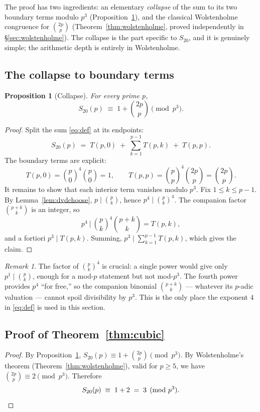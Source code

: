 \documentclass[11pt,a4paper]{article}
\newtheorem{proposition}[theorem]{Proposition}
\theoremstyle{definition}
\theoremstyle{remark}
\newtheorem{remark}[theorem]{Remark}
\newcommand{\Sx}{S_{20}}
\begin{document}
The proof has two ingredients: an elementary \emph{collapse} of the sum to its
two boundary terms modulo $p^{3}$ (Proposition~\ref{prop:collapse}), and the
classical Wolstenholme congruence for $\binom{2p}{p}$
(Theorem~\ref{thm:wolstenholme}, proved independently in \S\ref{sec:wolstenholme}).
The collapse is the part specific to $\Sx$, and it is genuinely simple; the
arithmetic depth is entirely in Wolstenholme.

\subsection{The collapse to boundary terms}

\begin{proposition}[Collapse]\label{prop:collapse}
For every prime $p$,
\[
  \Sx(p)\;\equiv\; 1 + \binom{2p}{p}\pmod{p^{3}}.
\]
\end{proposition}

\begin{proof}
Split the sum \eqref{eq:def} at its endpoints:
\[
  \Sx(p) \;=\; T(p,0) \;+\; \sum_{k=1}^{p-1} T(p,k) \;+\; T(p,p).
\]
The boundary terms are explicit:
\[
  T(p,0)=\binom{p}{0}^{4}\binom{p}{0}=1,
  \qquad
  T(p,p)=\binom{p}{p}^{4}\binom{2p}{p}=\binom{2p}{p}.
\]
It remains to show that each interior term vanishes modulo $p^{3}$.  Fix
$1\le k\le p-1$.  By Lemma~\ref{lem:dvdchoose}, $p\mid\binom{p}{k}$, hence
$p^{4}\mid\binom{p}{k}^{4}$.  The companion factor $\binom{p+k}{k}$ is an
integer, so
\[
  p^{4}\ \Big|\ \binom{p}{k}^{4}\binom{p+k}{k} = T(p,k),
\]
and a fortiori $p^{3}\mid T(p,k)$.  Summing, $p^3 \mid \sum_{k=1}^{p-1}T(p,k)$,
which gives the claim.
\end{proof}

\begin{remark}
The factor of $\binom{p}{k}^{4}$ is crucial: a single power would give only
$p^{1}\mid\binom{p}{k}$, enough for a mod-$p$ statement but not mod-$p^{3}$.  The
fourth power provides $p^{4}$ ``for free,'' so the companion binomial
$\binom{p+k}{k}$ --- whatever its $p$-adic valuation --- cannot spoil
divisibility by $p^{3}$.  This is the only place the exponent $4$ in
\eqref{eq:def} is used in this section.
\end{remark}

\subsection{Proof of Theorem~\ref{thm:cubic}}

\begin{proof}
By Proposition~\ref{prop:collapse}, $\Sx(p)\equiv 1+\binom{2p}{p}\pmod{p^{3}}$.
By Wolstenholme's theorem (Theorem~\ref{thm:wolstenholme}), valid for $p\ge5$,
we have $\binom{2p}{p}\equiv 2\pmod{p^{3}}$.  Therefore
\[
  \Sx(p)\;\equiv\;1+2\;=\;3\pmod{p^{3}}. \qedhere
\]
\end{proof}
\end{document}
